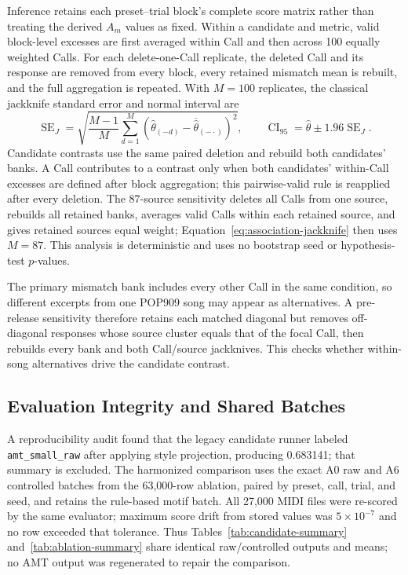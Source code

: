 \documentclass[11pt,a4paper]{article}
\begin{document}
Inference retains each preset--trial block's complete score matrix rather than treating the derived $A_m$ values as fixed. Within a candidate and metric, valid block-level excesses are first averaged within Call and then across 100 equally weighted Calls. For each delete-one-Call replicate, the deleted Call and its response are removed from every block, every retained mismatch mean is rebuilt, and the full aggregation is repeated. With $M=100$ replicates, the classical jackknife standard error and normal interval are
\begin{equation}
\operatorname{SE}_{J}=\sqrt{\frac{M-1}{M}\sum_{d=1}^{M}\left(\widehat\theta_{(-d)}-\overline{\widehat\theta}_{(-\cdot)}\right)^2},
\qquad \operatorname{CI}_{95}=\widehat\theta\pm1.96\operatorname{SE}_{J}.
\label{eq:association-jackknife}
\end{equation}
Candidate contrasts use the same paired deletion and rebuild both candidates' banks. A Call contributes to a contrast only when both candidates' within-Call excesses are defined after block aggregation; this pairwise-valid rule is reapplied after every deletion. The 87-source sensitivity deletes all Calls from one source, rebuilds all retained banks, averages valid Calls within each retained source, and gives retained sources equal weight; Equation~\eqref{eq:association-jackknife} then uses $M=87$. This analysis is deterministic and uses no bootstrap seed or hypothesis-test $p$-values.

The primary mismatch bank includes every other Call in the same condition, so different excerpts from one POP909 song may appear as alternatives. A pre-release sensitivity therefore retains each matched diagonal but removes off-diagonal responses whose source cluster equals that of the focal Call, then rebuilds every bank and both Call/source jackknives. This checks whether within-song alternatives drive the candidate contrast.

\subsection{Evaluation Integrity and Shared Batches}
\label{subsec:evaluation-integrity}

A reproducibility audit found that the legacy candidate runner labeled \texttt{amt\_small\_raw} after applying style projection, producing 0.683141; that summary is excluded. The harmonized comparison uses the exact A0 raw and A6 controlled batches from the 63,000-row ablation, paired by preset, call, trial, and seed, and retains the rule-based motif batch. All 27,000 MIDI files were re-scored by the same evaluator; maximum score drift from stored values was $5\times10^{-7}$ and no row exceeded that tolerance. Thus Tables~\ref{tab:candidate-summary} and~\ref{tab:ablation-summary} share identical raw/controlled outputs and means; no AMT output was regenerated to repair the comparison.
\end{document}
